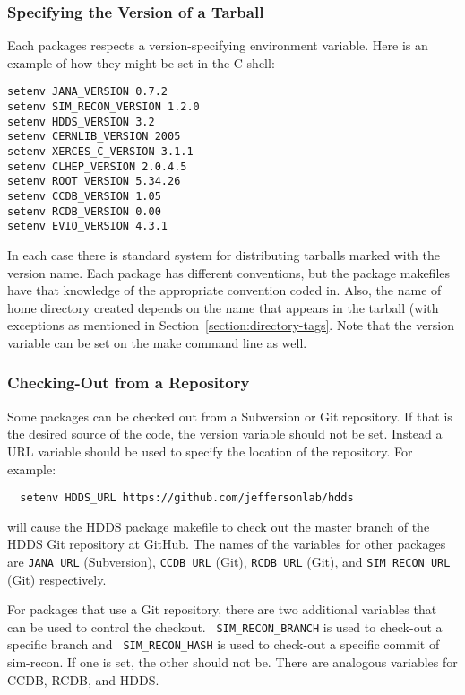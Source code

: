 \documentclass[12pt]{article}
\begin{document}
\subsubsection{Specifying the Version of a Tarball}

Each packages respects a version-specifying environment variable. Here
is an example of how they might be set in the C-shell:

\begin{verbatim}
setenv JANA_VERSION 0.7.2
setenv SIM_RECON_VERSION 1.2.0
setenv HDDS_VERSION 3.2
setenv CERNLIB_VERSION 2005
setenv XERCES_C_VERSION 3.1.1
setenv CLHEP_VERSION 2.0.4.5
setenv ROOT_VERSION 5.34.26
setenv CCDB_VERSION 1.05
setenv RCDB_VERSION 0.00
setenv EVIO_VERSION 4.3.1
\end{verbatim}

In each case there is standard system for distributing tarballs marked
with the version name. Each package has different conventions, but the
package makefiles have that knowledge of the appropriate convention
coded in. Also, the name of home directory created depends on the name
that appears in the tarball (with exceptions as mentioned in
Section~\ref{section:directory-tags}. Note that the version variable
can be set on the make command line as well.

\subsubsection{Checking-Out from a Repository}

Some packages can be checked out from a Subversion or Git
repository. If that is the desired source of the code, the version
variable should not be set. Instead a URL variable should be used to
specify the location of the repository. For example:

\begin{verbatim}
  setenv HDDS_URL https://github.com/jeffersonlab/hdds
\end{verbatim}

will cause the HDDS package makefile to check out the master branch of
the HDDS Git repository at GitHub. The names of the variables for
other packages are {\tt JANA\_URL} (Subversion), {\tt CCDB\_URL}
(Git), {\tt RCDB\_URL} (Git), and {\tt SIM\_RECON\_URL} (Git)
respectively.

For packages that use a Git repository, there are two additional
variables that can be used to control the checkout. {\tt
  SIM\_RECON\_BRANCH} is used to check-out a specific branch and {\tt
  SIM\_RECON\_HASH} is used to check-out a specific commit of
sim-recon. If one is set, the other should not be. There are analogous
variables for CCDB, RCDB, and HDDS.
\end{document}
